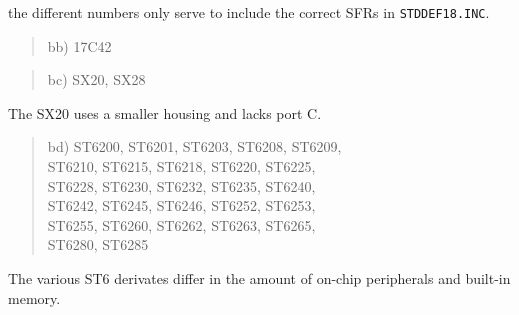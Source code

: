 \documentclass[12pt,twoside]{report}
\newcommand{\tty}[1]{{\tt #1}}
\begin{document}
the different numbers only serve to include the correct SFRs in
\tty{STDDEF18.INC}.
\begin{quote}
bb) 17C42
\end{quote}
\begin{quote}
bc) SX20, SX28
\end{quote}
The SX20 uses a smaller housing and lacks port C.
\begin{quote}
bd) ST6200, ST6201, ST6203, ST6208, ST6209,\\
    ST6210, ST6215, ST6218, ST6220, ST6225,\\
    ST6228, ST6230, ST6232, ST6235, ST6240,\\
    ST6242, ST6245, ST6246, ST6252, ST6253,\\
    ST6255, ST6260, ST6262, ST6263, ST6265,\\
    ST6280, ST6285
\end{quote}
The various ST6 derivates differ in the amount of
on-chip peripherals and built-in memory.
\end{document}
